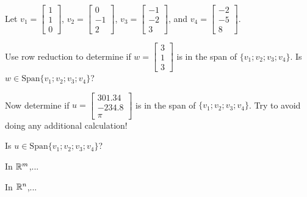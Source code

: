 Let $v_1 = \left[\begin{array}{c} 1 \\ 1  \\ 0 \end{array} \right]$, 
$v_2 = \left[\begin{array}{c} 0 \\ -1  \\ 2 \end{array} \right]$,
$v_3 = \left[\begin{array}{c} -1 \\ -2  \\ 3 \end{array} \right]$, and
$v_4 = \left[\begin{array}{c} -2 \\ -5  \\ 8 \end{array} \right]$.  

Use row reduction to determine if  $w = \left[\begin{array}{c} 3 \\ 1 \\ 3 \end{array} \right]$
is in the span of $\{v_1; v_2; v_3; v_4 \}$.  Is $w \in \mathrm{Span}\{v_1; v_2; v_3; v_4 \}$?   



\edXsolution{ 
}


\endedxproblem


Now determine if  $u = \left[\begin{array}{c} 301.34 \\ -234.8 \\ \pi \end{array} \right]$
is in the span of $\{v_1; v_2; v_3; v_4 \}$.  Try to avoid doing any additional calculation!

Is $u \in \mathrm{Span}\{v_1; v_2; v_3; v_4 \}$?   



\edXsolution{ 
}


\endedxproblem


\endedxvertical








In $\mathbb R^m$,...


\endedxtext



In $\mathbb R^n$,...


\endedxtext

\endedxvertical
